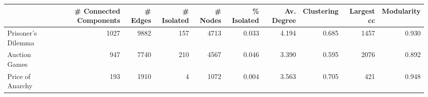 \begin{tabular}{lrrrrrrrrr}
\toprule
{} &  \# Connected Components &  \# Edges &  \# Isolated &  \# Nodes &  \% Isolated &  Av. Degree &  Clustering &  Largest cc &  Modularity \\
\midrule
Prisoner's Dilemma &                    1027 &     9882 &         157 &     4713 &       0.033 &       4.194 &       0.685 &        1457 &       0.930 \\
Auction Games      &                     947 &     7740 &         210 &     4567 &       0.046 &       3.390 &       0.595 &        2076 &       0.892 \\
Price of Anarchy   &                     193 &     1910 &           4 &     1072 &       0.004 &       3.563 &       0.705 &         421 &       0.948 \\
\bottomrule
\end{tabular}
